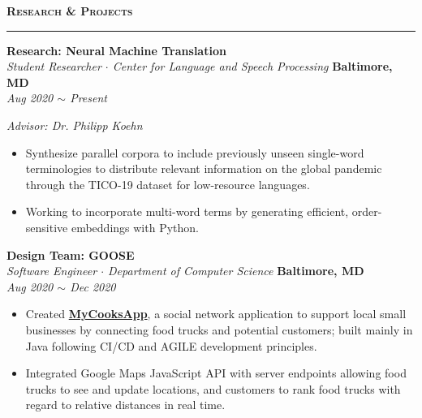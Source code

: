 \documentclass[10pt, letterpaper]{article}
\begin{document}
{\large \textbf{\textsc{Research \& Projects}}}
\vspace{5pt}
\hrule
{}
\begin{paracol}{2}
	\textbf{Research: Neural Machine Translation}\\
	\textit{Student Researcher $\cdot$ Center for Language and Speech Processing}
	\switchcolumn
	\raggedleft\textbf{Baltimore, MD}\\
	\raggedleft\textit{Aug 2020 $\sim$ Present}
\end{paracol}\vspace{-2mm}
\textit{Advisor: Dr. Philipp Koehn}
\vspace{-5mm}
\begin{itemize}
	 \item Synthesize parallel corpora to include previously unseen single-word terminologies to distribute relevant information on the global pandemic through the TICO-19 dataset for low-resource languages.\vspace{-3mm}
	 \item Working to incorporate multi-word terms by generating efficient, order-sensitive embeddings with Python.
\end{itemize}
\vspace{-3mm} 

\begin{paracol}{2}
	\textbf{Design Team: GOOSE}\\
	\textit{Software Engineer $\cdot$ Department of Computer Science }
	\switchcolumn
	\raggedleft\textbf{Baltimore, MD}\\
	\raggedleft\textit{Aug 2020 $\sim$ Dec 2020}
\end{paracol}\vspace{-5mm}
\begin{itemize}
	\item Created \href{https://goosegang-foodtruck.herokuapp.com/}{\textbf{MyCooksApp}}, a social network application to support local small businesses by connecting food trucks and potential customers; built mainly in Java following CI/CD and AGILE development principles.\vspace{-3mm}
	\item Integrated Google Maps JavaScript API with server endpoints allowing food trucks to see and update locations, and customers to rank food trucks with regard to relative distances in real time.
\end{itemize}
\vspace{-3mm} 
\end{document}
